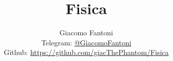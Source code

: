 

\title{\Huge \textbf{Fisica}}

\author{
  Giacomo Fantoni \\
  \small Telegram: \href{https://t.me/GiacomoFantoni}{@GiacomoFantoni} \\[3pt]
  \small Github: \href{https://github.com/giacThePhantom/Fisica}{https://github.com/giacThePhantom/Fisica}}


	\maketitle
	\tableofcontents
	


